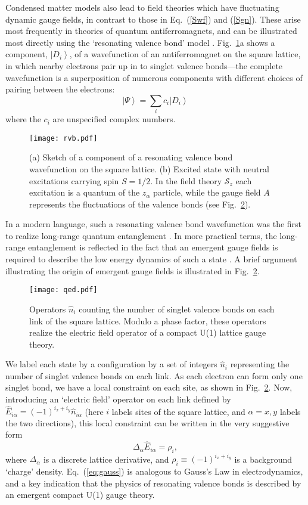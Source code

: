 \documentclass[10pt, oneside]{book}
\def\beq{\begin{equation}}
\def\eeq{\end{equation}}
\begin{document}
\begin{doublespace}
Condensed matter models also lead to field theories which have fluctuating dynamic gauge fields, in contrast to those in 
Eq.~(\ref{Swf}) and (\ref{Sgn}). These arise most frequently in theories of quantum antiferromagnets, and can be illustrated
most directly using the `resonating valence bond' model \cite{Pauling49,Anderson73}. 
Fig.~\ref{fig:rvb}a shows a component, $\left| D_i \right\rangle$, of a wavefunction
of an antiferromagnet on the square lattice, in which nearby electrons pair up in to singlet valence bonds---the complete wavefunction is a superposition of numerous components with different choices of pairing between the electrons:
\beq
\left| \Psi \right\rangle = \sum_i c_i \left| D_i \right\rangle
\eeq
where the $c_i$ are unspecified complex numbers.
\begin{figure}
\centering
\texttt{[image: rvb.pdf]}
\caption{\label{fig:rvb} (a) Sketch of a component of a resonating valence bond wavefunction on the square lattice.
(b) Excited state with neutral excitations carrying spin $S=1/2$. In the field theory $\mathcal{S}_z$ each excitation is a quantum of the $z_\alpha$
particle, while the gauge field $A$ represents the fluctuations of the valence bonds (see Fig.~\ref{fig:qed}).}
\end{figure}
In a modern language, such
a resonating valence bond wavefunction was the first to realize long-range quantum entanglement \cite{Melko15}. In more practical terms, the
long-range entanglement is reflected in the fact that an emergent gauge fields is required to describe the low energy 
dynamics of such a state \cite{GBPWA88,EFSK90}. 
A brief argument illustrating the origin of emergent gauge fields is illustrated in Fig.~\ref{fig:qed}.
\begin{figure}
\centering
\texttt{[image: qed.pdf]}
\caption{\label{fig:qed} Operators $\hat{n}_i$ counting the number of singlet valence bonds on each link of the square lattice.
Modulo a phase factor, these operators realize the electric field operator of a compact U(1) lattice gauge theory.}
\end{figure}
We label each state by a configuration by a set of integers $\hat{n}_i$ representing the number of singlet valence bonds 
on each link. As each electron can form only one singlet bond, we have a local constraint on each site, as shown in Fig.~\ref{fig:qed}. Now, introducing an `electric field' operator on each link defined by $\hat{E}_{i \alpha} = 
(-1)^{i_x + i_y} \hat{n}_{i \alpha}$ (here $i$ labels sites of the square lattice, and $\alpha = x, y$ labels the two directions), this
local constraint can be written in the very suggestive form
\beq
\Delta_\alpha \hat{E}_{i \alpha} = \rho_i , \label{eq:gauss}
\eeq
where $\Delta_\alpha$ is a discrete lattice derivative, and $\rho_i \equiv (-1)^{i_x + i_y}$ is a background `charge' density. 
Eq.~(\ref{eq:gauss}) is analogous to Gauss's Law in electrodynamics, and a key indication that the physics of resonating valence
bonds is described by an emergent compact U(1) gauge theory. 


\end{doublespace}
\end{document}

